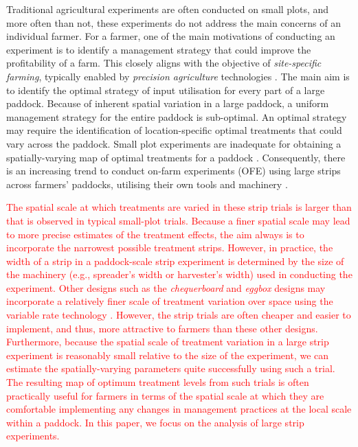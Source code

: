 \documentclass[a4paper]{article}   	%
\begin{document}
	Traditional agricultural experiments are often conducted on small plots, and more often than not, these experiments do not address the main concerns of an individual farmer. For a farmer, one of the main motivations of conducting an experiment is to identify a management strategy that could improve the profitability of a farm. This closely aligns with the objective of \emph{site-specific farming}, typically enabled by \emph{precision agriculture} technologies \parencite{Cook1998Precision}. The main aim is to identify the optimal strategy of input utilisation for every part of a large paddock. Because of inherent spatial variation in a large paddock, a uniform management strategy for the entire paddock is sub-optimal. An optimal strategy may require the identification of location-specific optimal treatments that could vary across the paddock. Small plot experiments are inadequate for obtaining a spatially-varying map of optimal treatments for a paddock \parencite{Rakshit2020Novel, Evans2020Assessment}. Consequently, there is an increasing trend to conduct on-farm experiments (OFE) using large strips across farmers' paddocks, utilising their own tools and machinery \parencite{Yan2002Onfarm, Rakshit2020Novel, Evans2020Assessment}.
	
	\textcolor{red}{The spatial scale at which treatments are varied in these strip trials is larger than that is observed in typical small-plot trials. Because a finer spatial scale may lead to more precise estimates of the treatment effects, the aim always is to incorporate the narrowest possible treatment strips. However, in practice, the width of a strip in a paddock-scale strip experiment is determined by the size of the machinery (e.g., spreader's width or harvester's width) used in conducting the experiment. Other designs such as the \emph{chequerboard} and \emph{eggbox} designs may incorporate a relatively finer scale of treatment variation over space using the variable rate technology \parencite{cook2018}. However, the strip trials are often cheaper and easier to implement, and thus, more attractive to farmers than these other designs. Furthermore, because the spatial scale of treatment variation in a large strip experiment is reasonably small relative to the size of the experiment, we can estimate the spatially-varying parameters quite successfully using such a trial. The resulting map of optimum treatment levels from such trials is often practically useful for farmers in terms of the spatial scale at which they are comfortable implementing any changes in management practices at the local scale within a paddock. In this paper, we focus on the analysis of large strip experiments.}  
	
\end{document}
